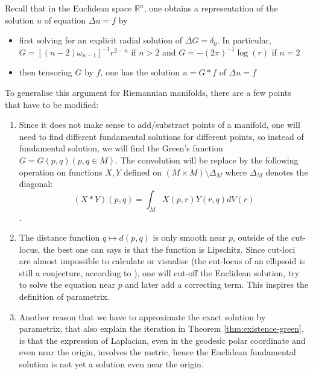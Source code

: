 Recall that in the Euclidean space \(\mathbb{R}^n\), one obtains a representation of the
solution \(u\) of equation \(\Delta u = f\) by
\begin{itemize}
\item first solving for an explicit radial solution of \(\Delta G = \delta_0\). In
particular, \(G = [(n-2)\omega_{n-1}]^{-1}r^{2-n}\) if \(n>2\) and \(G=
   -(2\pi)^{-1}\log(r)\) if \(n=2\)
\item then tensoring \(G\) by \(f\), one has the solution \(u=G* f\) of \(\Delta u = f\)
\end{itemize}

To generalise this argument for Riemannian manifolds, there are a few points that have to be
modified:
\begin{enumerate}
\item Since it does not make sense to add/substract points of a manifold, one will need to
find different fundamental solutions for different points, so instead of fundamental
solution, we will find the Green's function \(G=G(p,q)  (p,q\in M)\). The convolution will be replace by the following operation on functions \(X, Y\) defined on \((M\times M)\setminus \Delta_M\) where \(\Delta_M\) denotes the diagonal:
\[
    (X * Y) (p,q)= \int_M X(p,r) Y(r,q) dV(r)
   \].
\item The distance function \(q \mapsto d(p,q)\) is only smooth near \(p\), outside of
the cut-locus, the best one can says is that the function is Lipschitz. Since cut-loci
are almost impossible to calculate or visualise (the cut-locus of an ellipsoid is still
a conjecture, according to \cite{berger_panoramic_2003}), one will cut-off the Euclidean
solution, try to solve the equation near \(p\) and later add a correcting term. This
inspires the definition of parametrix.
\item Another reason that we have to approximate the exact solution by parametrix, that also
explain the iteration in Theorem \ref{thm:existence-green}, is that the expression of
Laplacian, even in the geodesic polar coordinate and even near the origin, involves the
metric, hence the Euclidean fundamental solution is not yet a solution even near the
origin.
\end{enumerate}

